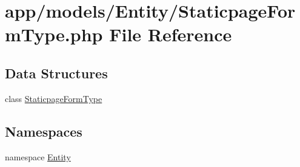 \hypertarget{_staticpage_form_type_8php}{\section{app/models/\-Entity/\-Staticpage\-Form\-Type.php File Reference}
\label{_staticpage_form_type_8php}
}
\subsection*{Data Structures}
\begin{DoxyCompactItemize}
\item 
class \hyperlink{class_entity_1_1_staticpage_form_type}{Staticpage\-Form\-Type}
\end{DoxyCompactItemize}
\subsection*{Namespaces}
\begin{DoxyCompactItemize}
\item 
namespace \hyperlink{namespace_entity}{Entity}
\end{DoxyCompactItemize}
